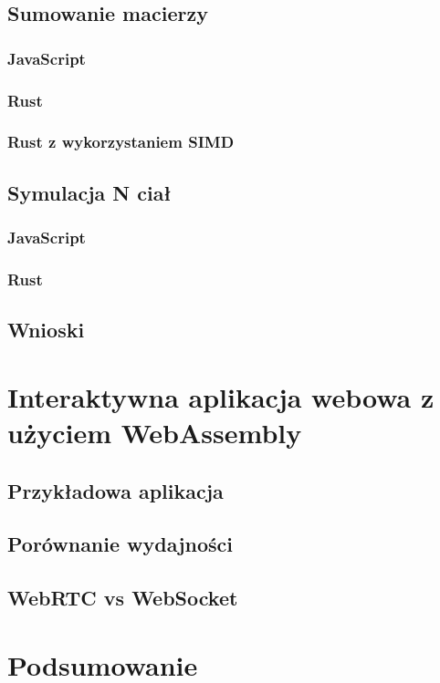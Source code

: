 \documentclass[language=polish,type=master]{aghmodern}
\begin{document}
\section{Sumowanie macierzy}

\subsection{JavaScript}

\subsection{Rust}

\subsection{Rust z wykorzystaniem SIMD}

\section{Symulacja N ciał}

\subsection{JavaScript}

\subsection{Rust}

\section{Wnioski}

\chapter{Interaktywna aplikacja webowa z użyciem WebAssembly}

\section{Przykładowa aplikacja}

\section{Porównanie wydajności}

\section{WebRTC vs WebSocket}

\chapter{Podsumowanie}

\backmatter

\cleardoublepage
\listoffigures

\cleardoublepage
\listoftables

\cleardoublepage
\printbibliography
\end{document}
